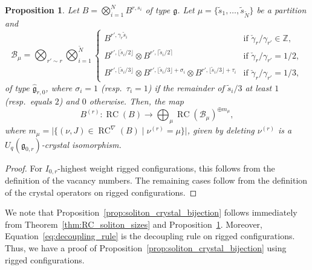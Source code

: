 \documentclass[reqno]{amsart}
\newcommand{\g}{\mathfrak{g}}
\newcommand{\modgamma}{\check{\gamma}} %
\DeclareMathOperator{\RC}{RC} %
\newcommand{\hwRC}{\RC^{\nabla}} %
\newcommand{\ZZ}{\mathbb{Z}}
\theoremstyle{plain}
\newtheorem{prop}[thm]{Proposition}
\theoremstyle{definition}
\numberwithin{equation}{section}
\begin{document}
\begin{prop}
\label{prop:RC_restriction}
Let $B = \bigotimes_{i=1}^N B^{r, s_i}$ of type $\g$.
Let $\mu = \{\widetilde{s}_1, \dotsc, \widetilde{s}_{\widetilde{N}}\}$ be a partition and
\[
\mathcal{B}_{\mu} = \bigotimes_{r' \sim r} \bigotimes_{i=1}^{\widetilde{N}} \begin{cases}
B^{r', \gamma_r \widetilde{s}_i} & \text{if $\modgamma_r / \gamma_{r'} \in \ZZ$}, \\
B^{r', \lfloor \widetilde{s}_i / 2 \rfloor} \otimes B^{r', \lceil \widetilde{s}_i / 2 \rceil} & \text{if $\modgamma_r / \gamma_{r'} = 1/2$}, \\
B^{r', \lfloor \widetilde{s}_i / 3 \rfloor} \otimes B^{r', \lfloor \widetilde{s}_i / 3 \rfloor + \sigma_i} \otimes B^{r', \lfloor \widetilde{s}_i / 3 \rfloor + \tau_i} & \text{if $\modgamma_r / \gamma_{r'} = 1/3$},
\end{cases}
\]
of type $\widehat{\g}_{r,0}$, where $\sigma_i = 1$ (resp.~$\tau_i = 1$) if the remainder of $\widetilde{s}_i / 3$ at least $1$ (resp.\ equals $2$) and $0$ otherwise.
Then, the map
\begin{equation}
\label{eq:decoupling_rule}
B^{(r)} \colon \RC(B) \to \bigoplus_{\mu} \RC(\mathcal{B}_{\mu})^{\oplus m_{\mu}},
\end{equation}
where $m_{\mu} = \lvert \{ (\nu, J) \in \hwRC(B) \mid \nu^{(r)} = \mu \} \rvert$,
given by deleting $\nu^{(r)}$ is a $U_q(\g_{0,r})$-crystal isomorphism.
\end{prop}

\begin{proof}
For $I_{0,r}$-highest weight rigged configurations, this follows from the definition of the vacancy numbers.
The remaining cases follow from the definition of the crystal operators on rigged configurations.
\end{proof}

We note that Proposition~\ref{prop:soliton_crystal_bijection} follows immediately from Theorem~\ref{thm:RC_soliton_sizes} and Proposition~\ref{prop:RC_restriction}.
Moreover, Equation~\eqref{eq:decoupling_rule} is the decoupling rule on rigged configurations.
Thus, we have a proof of Proposition~\ref{prop:soliton_crystal_bijection} using rigged configurations.
\end{document}
